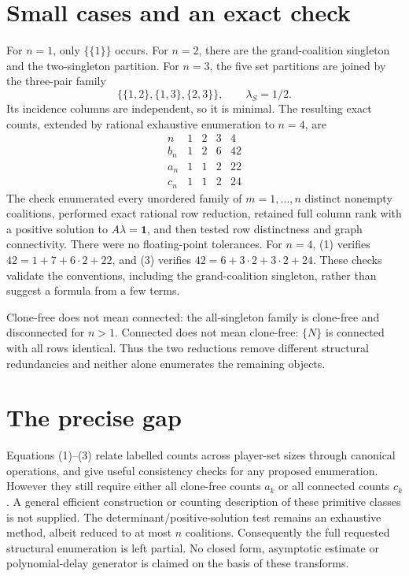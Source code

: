 \documentclass[11pt,a4paper]{article}
\begin{document}
\section{Small cases and an exact check}
For $n=1$, only $\{\{1\}\}$ occurs. For $n=2$, there are the grand-coalition singleton and the two-singleton partition. For $n=3$, the five set partitions are joined by the three-pair family
\[
 \{\{1,2\},\{1,3\},\{2,3\}\},\qquad\lambda_S=1/2.
\]
Its incidence columns are independent, so it is minimal. The resulting exact counts, extended by rational exhaustive enumeration to $n=4$, are
\[
\begin{array}{c|rrrr}
 n&1&2&3&4\\\hline
 b_n&1&2&6&42\\
 a_n&1&1&2&22\\
 c_n&1&1&2&24
\end{array}                                             \tag{4}
\]
The check enumerated every unordered family of $m=1,\ldots,n$ distinct nonempty coalitions, performed exact rational row reduction, retained full column rank with a positive solution to $A\lambda=\mathbf1$, and then tested row distinctness and graph connectivity. There were no floating-point tolerances. For $n=4$, (1) verifies $42=1+7+6\cdot2+22$, and (3) verifies $42=6+3\cdot2+3\cdot2+24$. These checks validate the conventions, including the grand-coalition singleton, rather than suggest a formula from a few terms.

Clone-free does not mean connected: the all-singleton family is clone-free and disconnected for $n>1$. Connected does not mean clone-free: $\{N\}$ is connected with all rows identical. Thus the two reductions remove different structural redundancies and neither alone enumerates the remaining objects.

\section{The precise gap}
Equations (1)--(3) relate labelled counts across player-set sizes through canonical operations, and give useful consistency checks for any proposed enumeration. However they still require either all clone-free counts $a_k$ or all connected counts $c_k$. A general efficient construction or counting description of these primitive classes is not supplied. The determinant/positive-solution test remains an exhaustive method, albeit reduced to at most $n$ coalitions. Consequently the full requested structural enumeration is left partial. No closed form, asymptotic estimate or polynomial-delay generator is claimed on the basis of these transforms.
\end{document}
